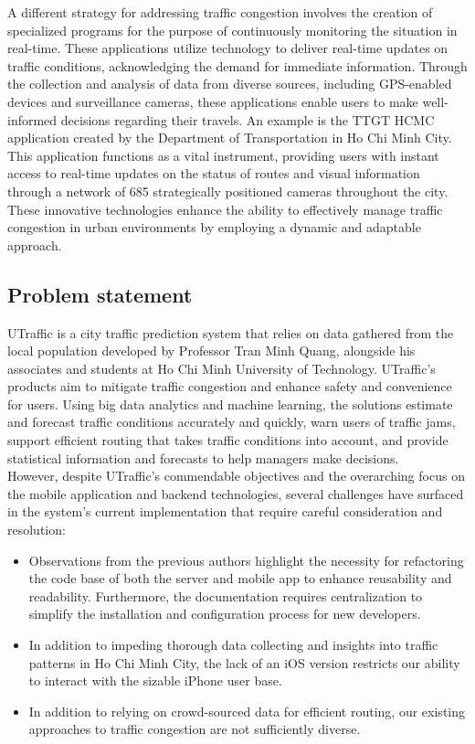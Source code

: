 A different strategy for addressing traffic congestion involves the creation of specialized programs for the purpose of continuously monitoring the situation in real-time. These applications utilize technology to deliver real-time updates on traffic conditions, acknowledging the demand for immediate information. Through the collection and analysis of data from diverse sources, including GPS-enabled devices and surveillance cameras, these applications enable users to make well-informed decisions regarding their travels. An example is the TTGT HCMC application created by the Department of Transportation in Ho Chi Minh City. This application functions as a vital instrument, providing users with instant access to real-time updates on the status of routes and visual information through a network of 685 strategically positioned cameras throughout the city. These innovative technologies enhance the ability to effectively manage traffic congestion in urban environments by employing a dynamic and adaptable approach.

\subsection{Problem statement}

UTraffic \cite{utraffic-introduction} is a city traffic prediction system that relies on data gathered from the local population developed by Professor Tran Minh Quang, alongside his associates and students at Ho Chi Minh University of Technology. UTraffic's products aim to mitigate traffic congestion and enhance safety and convenience for users. Using big data analytics and machine learning, the solutions estimate and forecast traffic conditions accurately and quickly, warn users of traffic jams, support efficient routing that takes traffic conditions into account, and provide statistical information and forecasts to help managers make decisions. \\
However, despite UTraffic's commendable objectives and the overarching focus on the mobile application and backend technologies, several challenges have surfaced in the system's current implementation that require careful consideration and resolution:

\begin{itemize}
    \item Observations from the previous authors highlight the necessity for refactoring the code base of both the server and mobile app to enhance reusability and readability. Furthermore, the documentation requires centralization to simplify the installation and configuration process for new developers.\cite{refactor_needed}
    
    \item In addition to impeding thorough data collecting and insights into traffic patterns in Ho Chi Minh City, the lack of an iOS version restricts our ability to interact with the sizable iPhone user base.
    
    \item In addition to relying on crowd-sourced data for efficient routing, our existing approaches to traffic congestion are not sufficiently diverse.
\end{itemize}



